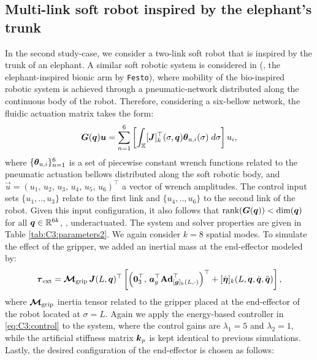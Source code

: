 
\subsection{Multi-link soft robot inspired by the elephant's trunk}
In the second study-case, we consider a two-link soft robot that is inspired by the trunk of an elephant. A similar soft robotic system is considered in \cite{Falkenhahn2015} (\ie, the elephant-inspired bionic arm by \texttt{Festo}), where mobility of the bio-inspired robotic system is achieved through a pneumatic-network distributed along the continuous body of the robot. Therefore, considering a six-bellow network, the fluidic actuation matrix takes the form:
%
\begin{equation*}
\boldsymbol{G}(\boldsymbol{q})\boldsymbol{u} = \sum_{n=1}^6 \left[ \int_{\mathbb{X}} [\boldsymbol{J}]_k^\top(\sigma,\boldsymbol{q}) {\boldsymbol{\theta}}_{\textrm{u},i}(\sigma)\; d\sigma\right] u_i,
\end{equation*}
%
where $\{{\boldsymbol{\theta}}_{\textrm{u},i}\}_{n=1}^6$ is a set of piecewise constant wrench functions related to the pneumatic actuation bellows distributed along the soft robotic body, and $\vec{u} = (u_1,\,u_2,\,u_3,\,u_4,\,u_5,\,u_6)^\top$ a vector of wrench amplitudes. The control input sets $\{u_1,..,u_3\}$ relate to the first link and $\{u_4,..,u_6\}$ to the second link of the robot. Given this input configuration, it also follows that $\textnormal{rank}(\boldsymbol{G}(\boldsymbol{q})) < \text{dim}(\boldsymbol{q})$ for all $\boldsymbol{q} \in \mathbb{R}^{6k}$, \ie, underactuated. The system and solver properties are given in Table \ref{tab:C3:parameters2}. We again consider $k=8$ spatial modes. To simulate the effect of the gripper, we added an inertial mass at the end-effector modeled by:
%
$$\boldsymbol{\tau}_{\textrm{ext}} =  \boldsymbol{\mathcal{M}}_{\textrm{grip}}\,{\boldsymbol{J}}(L,{\boldsymbol{q}})^\top \left[ \left(\boldsymbol{0}_3^\top,\, {\boldsymbol{a}}_g ^\top \textbf{Ad}^\top_{[{\boldsymbol{g}}]_k(L,\cdot)} \right)^\top + [\dot{{\boldsymbol{\eta}}}]_k(L,{\boldsymbol{q}},{\dot{\boldsymbol{q}}},{\ddot{\boldsymbol{q}}}) \right],$$
%
where $\boldsymbol{\mathcal{M}}_{\textrm{grip}}$ inertia tensor related to the gripper placed at the end-effector of the robot located at $\sigma = L$. Again we apply the energy-based controller in \eqref{eq:C3:control} to the system, where the control gains are $\lambda_1 = 5$ and $\lambda_2 = 1$, while the artificial stiffness matrix $\boldsymbol{k}_p$ is kept identical to previous simulations. Lastly, the desired configuration of the end-effector is chosen as follows:
